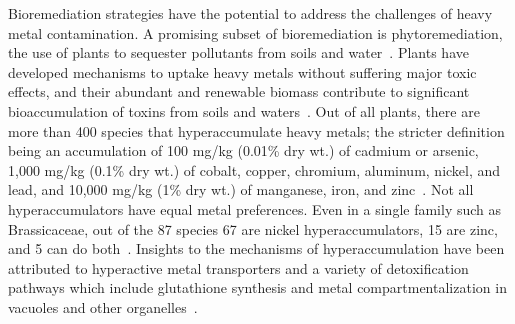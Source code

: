 \documentclass[../main/main]{subfiles}
\begin{document}
Bioremediation strategies have the potential to address the challenges of heavy metal contamination. A promising subset of bioremediation is phytoremediation, the use of plants to sequester pollutants from soils and water~\cite{marques2009remediation,singh2015}. Plants have developed mechanisms to uptake heavy metals without suffering major toxic effects, and their abundant and renewable biomass contribute to significant bioaccumulation of toxins from soils and waters~\cite{marques2009remediation,singh2015}.
Out of all plants, there are more than 400 species that hyperaccumulate heavy metals; the stricter definition being an accumulation of 100 mg/kg (0.01\% dry wt.) of cadmium or arsenic, 1,000 mg/kg (0.1\% dry wt.) of cobalt, copper, chromium, aluminum, nickel, and lead, and 10,000 mg/kg (1\% dry wt.) of manganese, iron, and zinc~\cite{prasad2003,kramer2010metal,branquinho2007revisiting}.
Not all hyperaccumulators have equal metal preferences. Even in a single family such as Brassicaceae, out of the 87 species 67 are nickel hyperaccumulators, 15 are zinc, and 5 can do both~\cite{prasad2003}. Insights to the mechanisms of hyperaccumulation have been attributed to hyperactive metal transporters and a variety of detoxification pathways which include glutathione synthesis and metal compartmentalization in vacuoles and other organelles~\cite{clemens2002,hall2002}.
\end{document}
